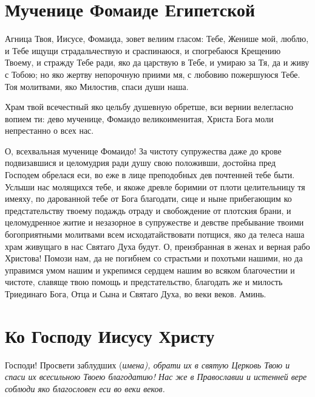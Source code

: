  

\section{Мученице Фомаиде Египетской}\begin{mymulticols}
 


 Агница Твоя, Иисусе, Фомаида, зовет велиим гласом: Тебе, Женише мой, люблю, и Тебе ищущи страдальчествую и сраспинаюся, и спогребаюся Крещению Твоему, и стражду Тебе ради, яко да царствую в Тебе, и умираю за Тя, да и живу с Тобою; но яко жертву непорочную приими мя, с любовию пожершуюся Тебе. Тоя молитвами, яко Милостив, спаси души наша.


 Храм твой всечестный яко цельбу душевную обретше, вси вернии велегласно вопием ти: дево мученице, Фомаидо великоименитая, Христа Бога моли непрестанно о всех нас.


 О, всехвальная мученице Фомаидо! За чистоту супружества даже до крове подвизавшися и целомудрия ради душу свою положивши, достойна пред Господем обрелася еси, во еже в лице преподобных дев почтенней тебе быти. Услыши нас молящихся тебе, и якоже древле боримии от плоти целительницу тя имеяху, по дарованной тебе от Бога благодати, сице и ныне прибегающим ко предстательству твоему подаждь отраду и свобождение от плотския брани, и целомудренное житие и незазорное в супружестве и девстве пребывание твоими богоприятными молитвами всем исходатайствовати потщися, яко да телеса наша храм живущаго в нас Святаго Духа будут. О, преизбранная в женах и верная рабо Христова! Помози нам, да не погибнем со страстьми и похотьми нашими, но да управимся умом нашим и укрепимся сердцем нашим во всяком благочестии и чистоте, славяще твою помощь и предстательство, благодать же и милость Триединаго Бога, Отца и Сына и Святаго Духа, во веки веков. Аминь. 

\end{mymulticols}

\mychapterending


 

\section{Ко Господу Иисусу Христу}\begin{mymulticols}
 

Господи! Просвети заблудших (\itshape имена\normalfont{}), обрати их в святую Церковь Твою и спаси их всесильною Твоею благодатию! Нас же в Православии и истенней вере соблюди яко благословен еси во веки веков.

\end{mymulticols}

